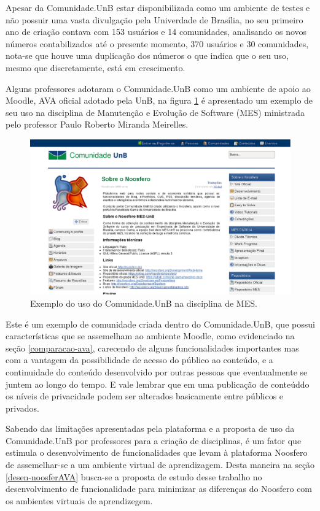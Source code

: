 Apesar da Comunidade.UnB estar disponibilizada como um ambiente de testes e não possuir uma vasta divulgação pela Univerdade de Brasília, no seu primeiro ano de criação contava com 153 usuários e 14 comunidades, analisando os novos números contabilizados até o presente momento, 370 usuários e 30 comunidades, nota-se que houve uma duplicação dos números o que indica que o seu uso, mesmo que discretamente, está em crescimento.

Alguns professores adotaram o Comunidade.UnB como um ambiente de apoio ao Moodle, AVA oficial adotado pela UnB, na figura \ref{comunidade-mes} é apresentado um exemplo de seu uso na disciplina de Manutenção e Evolução de Software (MES) ministrada pelo professor Paulo Roberto Miranda Meirelles.

\begin{figure}[!htb]
    \centering
    \includegraphics[keepaspectratio=true,scale=0.4]
      {figuras/comunidade-mes.eps}
    \caption{Exemplo do uso do Comunidade.UnB na disciplina de MES.}
    \label{comunidade-mes}
\end{figure}

Este é um exemplo de comunidade criada dentro do Comunidade.UnB, que possui características que se assemelham ao ambiente Moodle, como evidenciado na seção \ref{comparacao-ava}, carecendo de alguns funcionalidades importantes mas com a vantagem da possibilidade de acesso do público ao conteúdo, e a continuidade do conteúdo desenvolvido por outras pessoas que eventualmente se juntem ao longo do tempo. E vale lembrar que em uma publicação de conteúddo os níveis de privacidade podem ser alterados basicamente entre públicos e privados.

Sabendo das limitações apresentadas pela plataforma e a proposta de uso da Comunidade.UnB por professores para a criação de disciplinas, é um fator que estimula o desenvolvimento de funcionalidades que levam à plataforma Noosfero de assemelhar-se a um ambiente virtual de aprendizagem. Desta maneira na seção \ref{desen-noosferAVA} busca-se a proposta de estudo desse trabalho no desenvolvimento de funcionalidade para minimizar as diferenças do Noosfero com os ambientes virtuais de aprendizegem.
%

